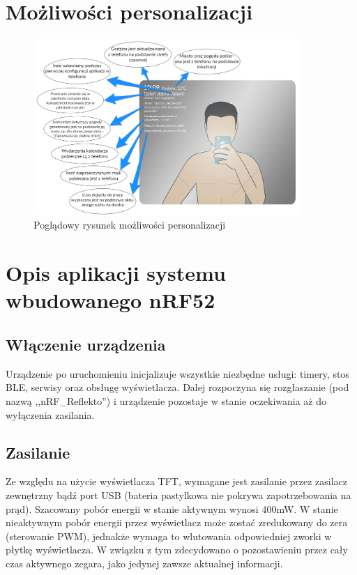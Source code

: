 \documentclass[a4paper,11pt]{article}
\begin{document}
\section{Możliwości personalizacji}
\begin{figure}[H]
	\includegraphics[width=0.9\textwidth,center]{dymki_kreski.png}
	\caption {Poglądowy rysunek możliwości personalizacji}
	\label{lustro_konf}
\end{figure}

\section{Opis aplikacji systemu wbudowanego nRF52}

\subsection{Włączenie urządzenia}
Urządzenie po uruchomieniu inicjalizuje wszystkie niezbędne usługi: timery, stos BLE, serwisy oraz obsługę wyświetlacza. Dalej rozpoczyna się rozgłaszanie (pod nazwą ,,nRF\_Reflekto'') i urządzenie pozostaje w stanie oczekiwania aż do wyłączenia zasilania. 

\subsection{Zasilanie}
Ze względu na użycie wyświetlacza TFT, wymagane jest zasilanie przez zasilacz zewnętrzny bądź port USB (bateria pastylkowa nie pokrywa zapotrzebowania na prąd). Szacowany pobór energii w stanie aktywnym wynosi 400mW. W stanie nieaktywnym pobór energii przez wyświetlacz może zostać zredukowany do zera (sterowanie PWM), jednakże wymaga to wlutowania odpowiedniej zworki w płytkę wyświetlacza. W związku z tym zdecydowano o pozostawieniu przez cały czas aktywnego zegara, jako jedynej zawsze aktualnej informacji.
\end{document}
